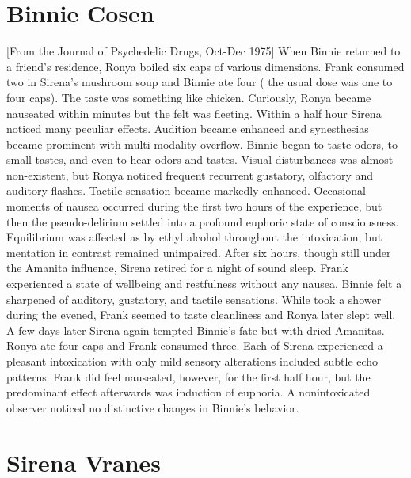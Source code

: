 \documentclass[12pt]{book}
\begin{document}
\chapter{Binnie Cosen}

[From the Journal of Psychedelic Drugs, Oct-Dec 1975] When Binnie returned to a friend's residence, Ronya boiled six caps of various dimensions. Frank consumed two in Sirena's mushroom soup and Binnie ate four ( the usual dose was one to four caps). The taste was something like chicken. Curiously, Ronya became nauseated within minutes but the felt was fleeting. Within a half hour Sirena noticed many peculiar effects. Audition became enhanced and synesthesias became prominent with multi-modality overflow. Binnie began to taste odors, to small tastes, and even to hear odors and tastes. Visual disturbances was almost non-existent, but Ronya noticed frequent recurrent gustatory, olfactory and auditory flashes. Tactile sensation became markedly enhanced. Occasional moments of nausea occurred during the first two hours of the experience, but then the pseudo-delirium settled into a profound euphoric state of consciousness. Equilibrium was affected as by ethyl alcohol throughout the intoxication, but mentation in contrast remained unimpaired. After six hours, though still under the Amanita influence, Sirena retired for a night of sound sleep. Frank experienced a state of wellbeing and restfulness without any nausea. Binnie felt a sharpened of auditory, gustatory, and tactile sensations. While took a shower during the evened, Frank seemed to taste cleanliness and Ronya later slept well. A few days later Sirena again tempted Binnie's fate but with dried Amanitas. Ronya ate four caps and Frank consumed three. Each of Sirena experienced a pleasant intoxication with only mild sensory alterations included subtle echo patterns. Frank did feel nauseated, however, for the first half hour, but the predominant effect afterwards was induction of euphoria. A nonintoxicated observer noticed no distinctive changes in Binnie's behavior.






\chapter{Sirena Vranes}
\end{document}
